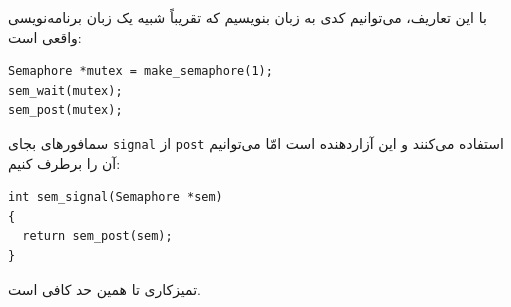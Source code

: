 \documentclass{book}
\begin{document}
    با این تعاریف، می‌توانیم کدی به زبان   بنویسیم که تقریباً شبیه یک زبان برنامه‌نویسی  واقعی است:‌

\begin{latin}
\begin{lstlisting}
Semaphore *mutex = make_semaphore(1);
sem_wait(mutex);
sem_post(mutex);
\end{lstlisting}
\end{latin}

    سمافورهای  بجای {\tt signal} از  {\tt post} استفاده می‌کنند و این آزاردهنده است امّا می‌توانیم آن را برطرف کنیم:‌
    
\begin{latin}
\begin{lstlisting}
int sem_signal(Semaphore *sem)
{
  return sem_post(sem);
}
\end{lstlisting}
\end{latin}

    تمیزکاری تا همین حد کافی است. 
\end{document}
